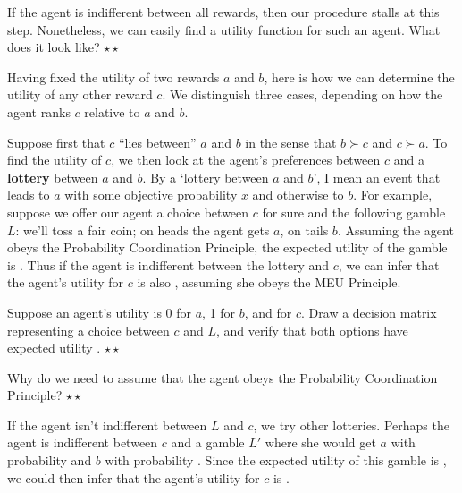 \begin{exercise}
  If the agent is indifferent between all rewards, then our procedure
  stalls at this step. Nonetheless, we can easily find a utility
  function for such an agent. What does it look like? $\star \star$
\end{exercise}

Having fixed the utility of two rewards $a$ and $b$, here is how we
can determine the utility of any other reward $c$. We distinguish
three cases, depending on how the agent ranks $c$ relative to $a$ and
$b$.

Suppose first that $c$ ``lies between'' $a$ and $b$ in the sense that
$b \succ c$ and $c \succ a$.  To find the utility of $c$, we then look
at the agent's preferences between $c$ and a \textbf{lottery} between
$a$ and $b$. By a `lottery between $a$ and $b$', I mean an event that
leads to $a$ with some objective probability $x$ and otherwise to
$b$. For example, suppose we offer our agent a choice between $c$ for
sure and the following gamble $L$: we'll toss a fair coin; on heads
the agent gets $a$, on tails $b$. Assuming the agent obeys the
Probability Coordination Principle, the expected utility of the gamble
is%
\cmnt{%
\[
  EU(L) = \nicefrac{1}{2} \times U(a) + \nicefrac{1}{2} \times U(b) =  
   \nicefrac{1}{2} \times 0 + \nicefrac{1}{2} \times 1 = \nicefrac{1}{2}. 
\]
} %
. Thus if the agent is indifferent between the lottery
and $c$, we can infer that the agent's utility for $c$ is also
, assuming she obeys the MEU Principle.

\begin{exercise}
  Suppose an agent's utility is 0 for $a$, 1 for $b$, and
   for $c$. Draw a decision matrix representing a
  choice between $c$ and $L$, and verify that both options have
  expected utility . $\star\star$
\end{exercise}

\begin{exercise}
  Why do we need to assume that the agent obeys the Probability
  Coordination Principle? $\star\star$
\end{exercise}

If the agent isn't indifferent between $L$ and $c$, we try other
lotteries.%
Perhaps the agent is indifferent between $c$ and a gamble $L'$ where
she would get $a$ with probability  and $b$ with
probability . Since the expected utility of this gamble
is , we could then infer that the agent's utility for
$c$ is .

